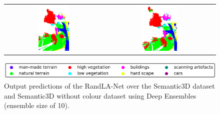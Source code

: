 \begin{figure}[h!]
\begin{tabular}{cc}
            \includegraphics[width=0.33\textwidth, height=0.18\textheight]{images/ood_imgs/de_sem3d/de_class_prob_3.pdf}&
            \includegraphics[width=0.33\textwidth, height=0.18\textheight]{images/sem3d_of/de_sem3d_of_3.pdf}\\
        \end{tabular}
        \includegraphics[scale=0.45]{images/legend.png}
        \caption{Output predictions of the RandLA-Net over the Semantic3D dataset and Semantic3D without colour
         dataset using Deep Ensembles (ensemble size of 10).}
        \label{fig:deepensemble_vis_sem3d_OF}
    \end{figure}
    
    \FloatBarrier
    
